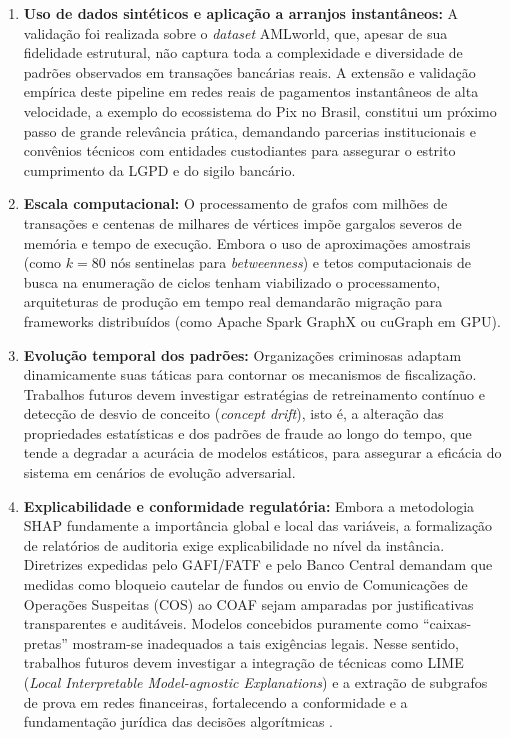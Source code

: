 \documentclass[a4paper,12pt,oneside,onecolumn,final,fleqn]{repUERJ}
\begin{document}
\begin{enumerate}
    \item \textbf{Uso de dados sintéticos e aplicação a arranjos instantâneos:} A validação foi realizada sobre o \textit{dataset} AMLworld, que, apesar de sua fidelidade estrutural, não captura toda a complexidade e diversidade de padrões observados em transações bancárias reais. A extensão e validação empírica deste pipeline em redes reais de pagamentos instantâneos de alta velocidade, a exemplo do ecossistema do Pix no Brasil, constitui um próximo passo de grande relevância prática, demandando parcerias institucionais e convênios técnicos com entidades custodiantes para assegurar o estrito cumprimento da LGPD e do sigilo bancário.
    
    \item \textbf{Escala computacional:} O processamento de grafos com milhões de transações e centenas de milhares de vértices impõe gargalos severos de memória e tempo de execução. Embora o uso de aproximações amostrais (como $k=80$ nós sentinelas para \textit{betweenness}) e tetos computacionais de busca na enumeração de ciclos tenham viabilizado o processamento, arquiteturas de produção em tempo real demandarão migração para frameworks distribuídos (como Apache Spark GraphX ou cuGraph em GPU).
    
    \item \textbf{Evolução temporal dos padrões:} Organizações criminosas adaptam dinamicamente suas táticas para contornar os mecanismos de fiscalização. Trabalhos futuros devem investigar estratégias de retreinamento contínuo e detecção de desvio de conceito (\textit{concept drift}), isto é, a alteração das propriedades estatísticas e dos padrões de fraude ao longo do tempo, que tende a degradar a acurácia de modelos estáticos, para assegurar a eficácia do sistema em cenários de evolução adversarial.
    
    \item \textbf{Explicabilidade e conformidade regulatória:} Embora a metodologia SHAP fundamente a importância global e local das variáveis, a formalização de relatórios de auditoria exige explicabilidade no nível da instância. Diretrizes expedidas pelo GAFI/FATF e pelo Banco Central demandam que medidas como bloqueio cautelar de fundos ou envio de Comunicações de Operações Suspeitas (COS) ao COAF sejam amparadas por justificativas transparentes e auditáveis. Modelos concebidos puramente como ``caixas-pretas'' mostram-se inadequados a tais exigências legais. Nesse sentido, trabalhos futuros devem investigar a integração de técnicas como LIME (\textit{Local Interpretable Model-agnostic Explanations}) e a extração de subgrafos de prova em redes financeiras, fortalecendo a conformidade e a fundamentação jurídica das decisões algorítmicas \cite{ribeiro2016should}.
\end{enumerate}
\end{document}
